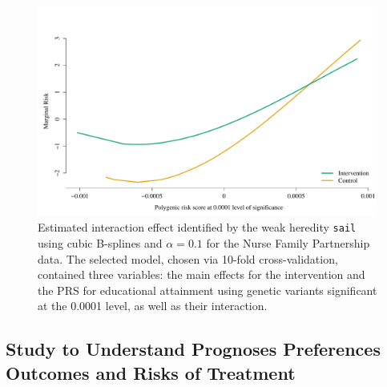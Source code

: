 \documentclass[12pt,letter]{article}\usepackage[]{graphicx}\usepackage[]{color}
\newenvironment{knitrout}{}{} %
\begin{document}
\begin{knitrout}\scriptsize
{}\color{fgcolor}\begin{figure}[h]

{\centering \includegraphics[width=1\linewidth]{figure/PRS-intervention-interaction-1} 

}

\caption[Estimated interaction effect identified by the weak heredity \texttt{sail} using cubic B-splines and $\alpha=0.1$ for the Nurse Family Partnership data]{Estimated interaction effect identified by the weak heredity \texttt{sail} using cubic B-splines and $\alpha=0.1$ for the Nurse Family Partnership data. The selected model, chosen via 10-fold cross-validation, contained three variables: the main effects for the intervention and the PRS for educational attainment using genetic variants significant at the 0.0001 level, as well as their interaction.}\label{fig:PRS-intervention-interaction}
\end{figure}

\end{knitrout}









\subsection{Study to Understand Prognoses Preferences Outcomes and Risks of Treatment}
\end{document}
